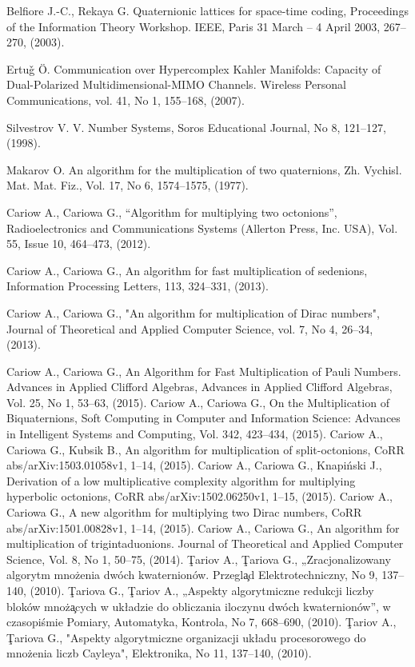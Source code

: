 \documentclass{jtacs}
\numberwithin{equation}{section}
\begin{document}
\begin{thebibliography}{26}
 Belfiore J.-C., Rekaya G. Quaternionic lattices for space-time coding, Proceedings of the Information
Theory Workshop. IEEE, Paris 31 March -- 4 April 2003, 267--270, (2003).

 Ertu\v{g} \"{O}. Communication over Hypercomplex Kahler Manifolds: Capacity of Dual-Polarized
Multidimensional-MIMO Channels. Wireless Personal Communications, vol. 41, No 1, 155--168, (2007).

Silvestrov V. V. Number Systems, Soros Educational Journal, No 8, 121--127, (1998).

 Makarov O. An algorithm for the multiplication of two quaternions, Zh. Vychisl. Mat. Mat.
Fiz., Vol. 17, No 6, 1574--1575, (1977).

 Cariow A., Cariowa G., “Algorithm for multiplying two octonions”, Radioelectronics and Communications Systems (Allerton Press, Inc. USA), Vol. 55, Issue 10, 464--473, (2012).

 Cariow A., Cariowa G., An algorithm for fast multiplication of sedenions, Information Processing Letters, 113,  324--331, (2013).

 Cariow A., Cariowa G., "An algorithm for multiplication of Dirac numbers", Journal of Theoretical and Applied Computer Science, vol. 7, No 4, 26--34, (2013).

 Cariow A., Cariowa G., An Algorithm for Fast Multiplication of Pauli Numbers. Advances in Applied Clifford Algebras, Advances in Applied Clifford Algebras, Vol. 25, No 1, 53--63, (2015).
 Cariow A., Cariowa G., On the Multiplication of Biquaternions, Soft Computing in Computer and Information Science: Advances in Intelligent Systems and Computing, Vol. 342, 423--434, (2015).
 Cariow A., Cariowa G., Kubsik B., An algorithm for multiplication of split-octonions, CoRR abs/arXiv:1503.01058v1, 1--14, (2015).
 Cariow A., Cariowa G., Knapi\'{n}ski J., Derivation of a low multiplicative complexity algorithm for multiplying hyperbolic octonions, CoRR abs/arXiv:1502.06250v1, 1--15, (2015).
 Cariow A., Cariowa G., A new algorithm for multiplying two Dirac numbers, CoRR abs/arXiv:1501.00828v1, 1--14, (2015).
 Cariow A., Cariowa G., An algorithm for multiplication of trigintaduonions. Journal of Theoretical and Applied Computer Science, Vol. 8, No 1, 50--75, (2014).
 \c{T}ariov A., \c{T}ariova G., „Zracjonalizowany algorytm mno\.{z}enia dw\'{o}ch kwaternion\'{o}w. Przegl\c{a}d Elektrotechniczny, No 9, 137--140, (2010).
 \c{T}ariova G., \c{T}ariov A., „Aspekty algorytmiczne redukcji liczby blok\'{o}w mno\.{z}\c{a}cych w uk\l{}adzie do obliczania iloczynu dw\'{o}ch kwaternion\'{o}w”, w czasopi\'{s}mie Pomiary, Automatyka, Kontrola, No 7, 668--690, (2010).
 \c{T}ariov A., \c{T}ariova G., "Aspekty algorytmiczne organizacji uk\l{}adu procesorowego do mno\.{z}enia liczb Cayleya", Elektronika, No 11, 137--140, (2010).


\end{thebibliography}
\end{document}
